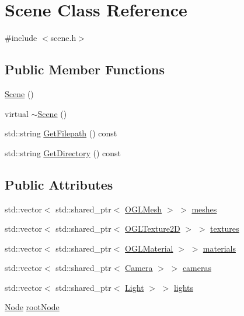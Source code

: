 \hypertarget{class_scene}{}\section{Scene Class Reference}
\label{class_scene}


{\ttfamily \#include $<$scene.\+h$>$}

\subsection*{Public Member Functions}
\begin{DoxyCompactItemize}
\item 
\hyperlink{class_scene_ad10176d75a9cc0da56626f682d083507}{Scene} ()
\item 
virtual \hyperlink{class_scene_a3b8cec2e32546713915f8c6303c951f1}{$\sim$\+Scene} ()
\item 
std\+::string \hyperlink{class_scene_ab87ffa881eb34b9545c665c74611c51c}{Get\+Filepath} () const 
\item 
std\+::string \hyperlink{class_scene_a2f336bf065c9810a863d3758ac017ed1}{Get\+Directory} () const 
\end{DoxyCompactItemize}
\subsection*{Public Attributes}
\begin{DoxyCompactItemize}
\item 
std\+::vector$<$ std\+::shared\+\_\+ptr$<$ \hyperlink{class_o_g_l_mesh}{O\+G\+L\+Mesh} $>$ $>$ \hyperlink{class_scene_aefec91bb2a143b58040a5962209d4b34}{meshes}
\item 
std\+::vector$<$ std\+::shared\+\_\+ptr$<$ \hyperlink{class_o_g_l_texture2_d}{O\+G\+L\+Texture2\+D} $>$ $>$ \hyperlink{class_scene_a9ac78c1e7dcb0e243c7279afff526661}{textures}
\item 
std\+::vector$<$ std\+::shared\+\_\+ptr$<$ \hyperlink{class_o_g_l_material}{O\+G\+L\+Material} $>$ $>$ \hyperlink{class_scene_a631fe5acccb40e34b55e22d8b941e010}{materials}
\item 
std\+::vector$<$ std\+::shared\+\_\+ptr$<$ \hyperlink{class_camera}{Camera} $>$ $>$ \hyperlink{class_scene_a93e268bf22b01395c867544ba94d2581}{cameras}
\item 
std\+::vector$<$ std\+::shared\+\_\+ptr$<$ \hyperlink{class_light}{Light} $>$ $>$ \hyperlink{class_scene_acc070003e3f35147692a64229ef2c9d3}{lights}
\item 
\hyperlink{class_node}{Node} \hyperlink{class_scene_a14b82ab277b794679fa68873a3920fd7}{root\+Node}
\end{DoxyCompactItemize}
